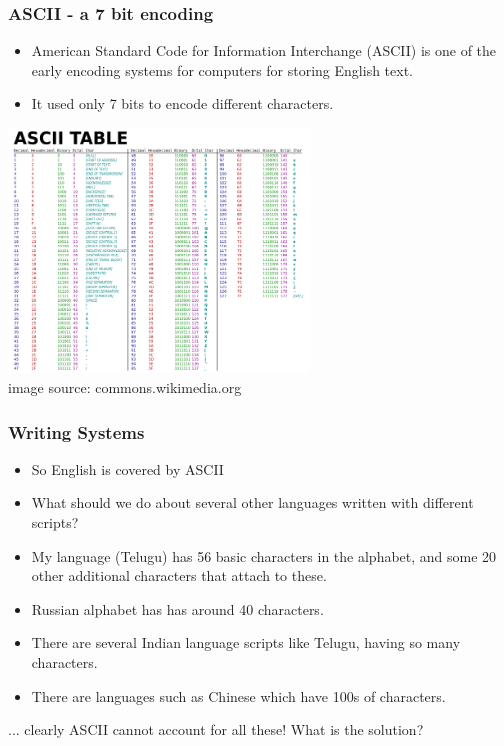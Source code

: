\documentclass{beamer}
\begin{document}
\begin{frame}
\frametitle{ASCII - a 7 bit encoding}
\begin{itemize}
\item American Standard Code for Information Interchange (ASCII) is one of the early encoding systems for computers for storing English text.
\item It used only 7 bits to encode different characters.
\end{itemize}
\includegraphics[width=0.6\textwidth]{ascii.png}
\\ image source: commons.wikimedia.org
\end{frame}

\begin{frame}
\frametitle{Writing Systems}
\begin{itemize}
\item So English is covered by ASCII
\item What should we do about several other languages written with different scripts?
\item My language (Telugu) has 56 basic characters in the alphabet, and some 20 other additional characters that attach to these. 
\item Russian alphabet has has around 40 characters.
\item There are several Indian language scripts like Telugu, having so many characters.
\item There are languages such as Chinese which have 100s of characters.
\end{itemize} \pause
... clearly ASCII cannot account for all these! What is the solution?
\end{frame}
\end{document}
